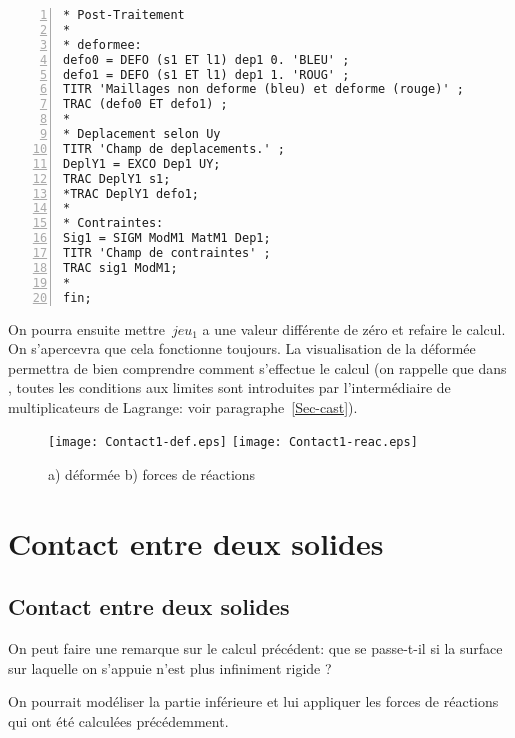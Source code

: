 \color{gris}\scriptsize
\begin{multicols}{2}
\begin{Verbatim}[numbers=left,numbersep=3pt,firstnumber=last]
* Post-Traitement
*
* deformee:
defo0 = DEFO (s1 ET l1) dep1 0. 'BLEU' ;
defo1 = DEFO (s1 ET l1) dep1 1. 'ROUG' ;
TITR 'Maillages non deforme (bleu) et deforme (rouge)' ;
TRAC (defo0 ET defo1) ;
*
* Deplacement selon Uy
TITR 'Champ de deplacements.' ;
DeplY1 = EXCO Dep1 UY;
TRAC DeplY1 s1;
*TRAC DeplY1 defo1;
*
* Contraintes:
Sig1 = SIGM ModM1 MatM1 Dep1;
TITR 'Champ de contraintes' ;
TRAC sig1 ModM1;
*
fin;
\end{Verbatim}
\end{multicols}
\color{black}\normalsize

\medskip
On pourra ensuite mettre~$jeu_1$ a une valeur différente de zéro et refaire le calcul.
On s'apercevra que cela fonctionne toujours. La visualisation de la déformée permettra
de bien comprendre comment s'effectue le calcul (on rappelle que dans \castem, toutes 
les conditions aux limites sont introduites par l'intermédiaire de multiplicateurs de
Lagrange: voir paragraphe~\ref{Sec-cast}).

\begin{figure}[ht]
  \texttt{[image: Contact1-def.eps]} \hfill 
  \texttt{[image: Contact1-reac.eps]}
  \caption{\label{Fig-Cont1} a) déformée b) %
forces de réactions}
\end{figure}













\medskip
\ifVersionAvecExemplesSepares
  \section{Contact entre deux solides}
\else
  \subsection{Contact entre deux solides}
\fi

On peut faire une remarque sur le calcul précédent: que se passe-t-il si la surface sur laquelle
on s'appuie n'est plus infiniment rigide ?

\medskip
On pourrait modéliser la partie inférieure et lui appliquer les forces de réactions qui ont été
calculées précédemment.

